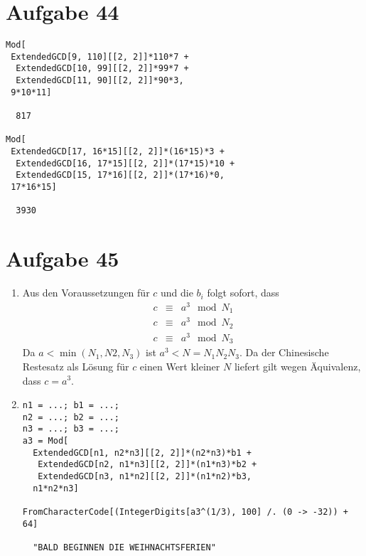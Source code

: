 \section*{Aufgabe 44}
\lstset{language=Mathematica}
\begin{lstlisting}
Mod[
 ExtendedGCD[9, 110][[2, 2]]*110*7 +
  ExtendedGCD[10, 99][[2, 2]]*99*7 +
  ExtendedGCD[11, 90][[2, 2]]*90*3,
 9*10*11]

  817

Mod[
 ExtendedGCD[17, 16*15][[2, 2]]*(16*15)*3 +
  ExtendedGCD[16, 17*15][[2, 2]]*(17*15)*10 +
  ExtendedGCD[15, 17*16][[2, 2]]*(17*16)*0,
 17*16*15]

  3930
\end{lstlisting}

\section*{Aufgabe 45}
\begin{enumerate}[(1)]
	\item Aus den Voraussetzungen für $c$ und die $b_i$ folgt sofort, dass
	\begin{eqnarray*}
		c &\equiv& a^3 \mod N_1\\
		c &\equiv& a^3 \mod N_2\\
		c &\equiv& a^3 \mod N_3
	\end{eqnarray*}
	Da $a < \min(N_1, N2, N_3)$ ist $a^3 < N = N_1 N_2 N_3$. Da der
	Chinesische Restesatz als Lösung für $c$ einen Wert kleiner $N$ liefert
	gilt wegen Äquivalenz, dass $c = a^3$.
	\item
\begin{lstlisting}
n1 = ...; b1 = ...;
n2 = ...; b2 = ...;
n3 = ...; b3 = ...;
a3 = Mod[
  ExtendedGCD[n1, n2*n3][[2, 2]]*(n2*n3)*b1 +
   ExtendedGCD[n2, n1*n3][[2, 2]]*(n1*n3)*b2 +
   ExtendedGCD[n3, n1*n2][[2, 2]]*(n1*n2)*b3,
  n1*n2*n3]

FromCharacterCode[(IntegerDigits[a3^(1/3), 100] /. (0 -> -32)) + 64]

  "BALD BEGINNEN DIE WEIHNACHTSFERIEN"
\end{lstlisting}
\end{enumerate}
